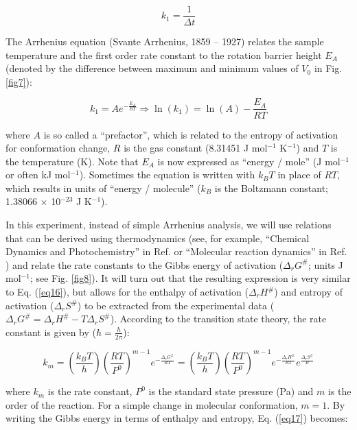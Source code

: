 \documentclass[byrevtex,amssymb,aps,pra,floatfix,letterpaper]{revtex4}
\begin{document}
\begin{equation}
k_1 = \frac{1}{\Delta t}
\label{eq15}
\end{equation}

\noindent
The Arrhenius equation (Svante Arrhenius, 1859 -- 1927) relates the sample temperature and the first order rate constant to the rotation barrier height $E_A$ (denoted by the difference between maximum and minimum values of $V_0$ in Fig. \ref{fig7}):

\begin{equation}
k_1 = Ae^{-\frac{E_A}{RT}} \Rightarrow \ln\left(k_1\right) = \ln(A) - \frac{E_A}{RT}
\label{eq16}
\end{equation}

\noindent
where $A$ is so called a ``prefactor'', which is related to the entropy of activation for conformation change, $R$ is the gas constant (8.31451 J mol$^{-1}$ K$^{-1}$) and $T$ is the temperature (K). Note that $E_A$ is now expressed as ``energy / mole'' (J mol$^{-1}$ or often kJ mol$^{-1}$). Sometimes the equation is written with $k_BT$ in place of $RT$, which results in units of ``energy / molecule'' ($k_B$ is the Boltzmann constant; 1.38066 $\times$ 10$^{-23}$ J K$^{-1}$).

In this experiment, instead of simple Arrhenius analysis, we will use relations that can be derived using thermodynamics (see, for example, ``Chemical Dynamics and Photochemistry'' in Ref. \cite{SILBEY} or ``Molecular reaction dynamics'' in Ref. \cite{ATKINS1}) and relate the rate constants to the Gibbs energy of activation ($\Delta_rG^\#$; units J mol$^{-1}$; see Fig. \ref{fig8}). It will turn out that the resulting expression is very similar to Eq. (\ref{eq16}), but allows for the enthalpy of activation ($\Delta_rH^\#$) and entropy of activation ($\Delta_rS^\#$) to be extracted from the experimental data ($\Delta_rG^\# = \Delta_rH^\# - T\Delta_rS^\#$). According to the transition state theory, the rate constant is given by ($\hbar = \frac{h}{2\pi}$):

\begin{equation}
k_m = \left(\frac{k_BT}{h}\right)\left(\frac{RT}{P^0}\right)^{m-1}e^{-\frac{\Delta_rG^\#}{RT}} = 
\left(\frac{k_BT}{h}\right)\left(\frac{RT}{P^0}\right)^{m-1}e^{-\frac{\Delta_rH^\#}{RT}}e^{\frac{\Delta_rS^\#}{R}}
\label{eq17}
\end{equation}

\noindent
where $k_m$ is the rate constant, $P^0$ is the standard state pressure (Pa) and $m$ is the order of the reaction. For a simple change in molecular conformation, $m = 1$. By writing the Gibbs energy in terms of enthalpy and entropy, Eq. (\ref{eq17}) becomes:
\end{document}
